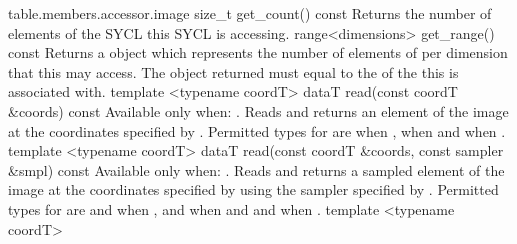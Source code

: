   {table.members.accessor.image}
  \addRow
    { size_t get_count() const }
    {
      Returns the number of elements of the SYCL  this SYCL  is accessing.
    }
  \addRow
    { range<dimensions> get_range() const }
    {
      Returns a  object which represents the number of
      elements of  per dimension that this
       may access.
      \newline
      The  object returned must equal to the
       of the  this 
      is associated with.
    }
  \addRowTwoSL
    { template <typename coordT> }
    { dataT read(const coordT \&coords) const }
    {
      Available only when: .
      \newline
      Reads and returns an element of the image at the coordinates specified by . Permitted types for  are  when ,  when  and  when .
    }
  \addRowTwoSL
    { template <typename coordT> }
    { dataT read(const coordT \&coords, const sampler \&smpl) const }
    {
      Available only when: .
      \newline
      Reads and returns a sampled element of the image at the coordinates
      specified by  using the sampler specified by
      . Permitted types for  are
       and  when ,  and  when  and  and  when
      .
    }
  \addRowTwoSL
    { template <typename coordT> }    
